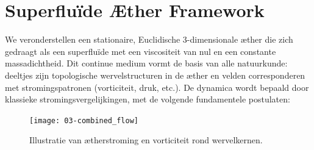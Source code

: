\section{Superfluïde Æther Framework}

We veronderstellen een stationaire, Euclidische 3-dimensionale æther die zich gedraagt als een superfluïde met een viscositeit van nul en een constante massadichtheid. Dit continue medium vormt de basis van alle natuurkunde: deeltjes zijn topologische wervelstructuren in de æther en velden corresponderen met stromingspatronen (vorticiteit, druk, etc.). De dynamica wordt bepaald door klassieke stromingsvergelijkingen, met de volgende fundamentele postulaten:

\begin{figure}[htbp]
    \centering
    \texttt{[image: 03-combined\_flow]}
    \caption{Illustratie van ætherstroming en vorticiteit rond wervelkernen.}
    \label{fig:vortexfields}
\end{figure}
